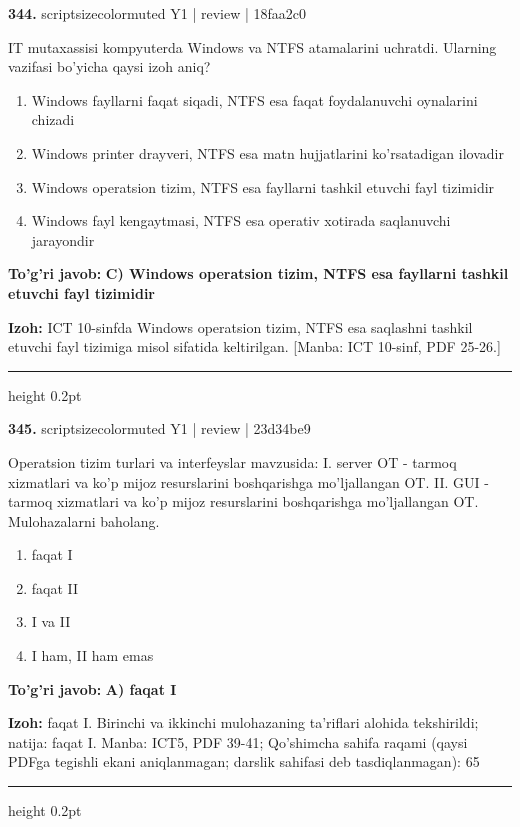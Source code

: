 \documentclass[10pt,a4paper]{article}
\begin{document}
{\bfseries\sffamily\color{ink} 344.} {scriptsizecolor{muted} Y1 | review | 18faa2c0}
\par
IT mutaxassisi kompyuterda Windows va NTFS atamalarini uchratdi. Ularning vazifasi bo'yicha qaysi izoh aniq?
\begin{enumerate}[label=\Alph*),leftmargin=9mm]
\item Windows fayllarni faqat siqadi, NTFS esa faqat foydalanuvchi oynalarini chizadi
\item Windows printer drayveri, NTFS esa matn hujjatlarini ko'rsatadigan ilovadir
\item Windows operatsion tizim, NTFS esa fayllarni tashkil etuvchi fayl tizimidir
\item Windows fayl kengaytmasi, NTFS esa operativ xotirada saqlanuvchi jarayondir
\end{enumerate}
\begin{tcolorbox}[enhanced,breakable,colback=teal!4,colframe=teal!60!black,boxrule=0.45pt,arc=1.2mm,left=2.7mm,right=2.7mm,top=1.8mm,bottom=1.8mm,before skip=2mm,after skip=2mm]
{\bfseries\sffamily\color{teal}To'g'ri javob:} \textbf{C) Windows operatsion tizim, NTFS esa fayllarni tashkil etuvchi fayl tizimidir}
\par\smallskip
{\bfseries Izoh:} ICT 10-sinfda Windows operatsion tizim, NTFS esa saqlashni tashkil etuvchi fayl tizimiga misol sifatida keltirilgan. [Manba: ICT 10-sinf, PDF 25-26.]
\end{tcolorbox}
\vspace{2mm}\hrule height 0.2pt\vspace{3mm}

{\bfseries\sffamily\color{ink} 345.} {scriptsizecolor{muted} Y1 | review | 23d34be9}
\par
Operatsion tizim turlari va interfeyslar mavzusida: I. server OT - tarmoq xizmatlari va ko'p mijoz resurslarini boshqarishga mo'ljallangan OT. II. GUI - tarmoq xizmatlari va ko'p mijoz resurslarini boshqarishga mo'ljallangan OT. Mulohazalarni baholang.
\begin{enumerate}[label=\Alph*),leftmargin=9mm]
\item faqat I
\item faqat II
\item I va II
\item I ham, II ham emas
\end{enumerate}
\begin{tcolorbox}[enhanced,breakable,colback=teal!4,colframe=teal!60!black,boxrule=0.45pt,arc=1.2mm,left=2.7mm,right=2.7mm,top=1.8mm,bottom=1.8mm,before skip=2mm,after skip=2mm]
{\bfseries\sffamily\color{teal}To'g'ri javob:} \textbf{A) faqat I}
\par\smallskip
{\bfseries Izoh:} faqat I. Birinchi va ikkinchi mulohazaning ta'riflari alohida tekshirildi; natija: faqat I. Manba: ICT5, PDF 39-41; Qo'shimcha sahifa raqami (qaysi PDFga tegishli ekani aniqlanmagan; darslik sahifasi deb tasdiqlanmagan): 65
\end{tcolorbox}
\vspace{2mm}\hrule height 0.2pt\vspace{3mm}
\end{document}
